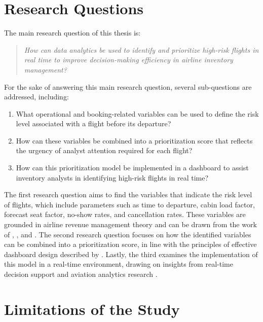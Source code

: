 \section{Research Questions}
\label{sec:rq}

The main research question of this thesis is:

\begin{quote}
\textit{How can data analytics be used to identify and prioritize high-risk flights in real time to improve decision-making efficiency in airline inventory management?}
\end{quote}

For the sake of answering this main research question, several sub-questions are addressed, including:

\begin{enumerate}
    \item What operational and booking-related variables can be used to define the risk level associated with a flight before its departure?
    \item How can these variables be combined into a prioritization score that reflects the urgency of analyst attention required for each flight?
    \item How can this prioritization model be implemented in a dashboard to assist inventory analysts in identifying high-risk flights in real time?
\end{enumerate}

The first research question aims to find the variables that indicate the risk level of flights, which include parameters such as time to departure, cabin load factor, forecast seat factor, no-show rates, and cancellation rates. These variables are grounded in airline revenue management theory and can be drawn from the work of \citet{Belobaba1987, Belobaba1989}, \citet{LeeHersh1993}, and \citet{PakPiersma2002}. The second research question focuses on how the identified variables can be combined into a prioritization score, in line with the principles of effective dashboard design described by \citet{YigitbasiogluVelcu2012}. Lastly, the third examines the implementation of this model in a real-time environment, drawing on insights from real-time decision support and aviation analytics research \citep{RakshitKrishnamurthyYu1996, Salleh2023, WatsonWixomHoffer2006}.

\section{Limitations of the Study}
\label{sec:limitations}

